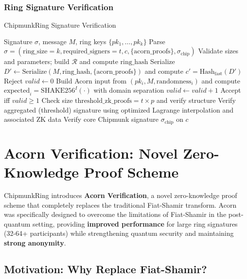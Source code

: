 \documentclass[11pt,a4paper]{article}
\begin{document}
\subsubsection{Ring Signature Verification}
\begin{algorithm}
\caption{ChipmunkRing Signature Verification}
\begin{algorithmic}[1]
\REQUIRE Signature $\sigma$, message $M$, ring keys $\{pk_1, \ldots, pk_k\}$
\STATE Parse $\sigma = (\text{ring\_size}=k, \text{required\_signers}=t, c, \{\text{acorn\_proofs}\}, \sigma_{\text{chip}})$
\STATE Validate sizes and parameters; build $\mathcal{R}$ and compute $\text{ring\_hash}$
\STATE Serialize $D' \leftarrow \text{Serialize}(M, \text{ring\_hash}, \{\text{acorn\_proofs}\})$ and compute $c' = \text{Hash}_{\text{fast}}(D')$
 \RETURN Reject \ENDIF
{} 
    \STATE $valid \leftarrow 0$
        \STATE Build Acorn input from $(pk_i, M, \text{randomness}_i)$ and compute $\text{expected}_i = \text{SHAKE256}^{I}(\cdot)$ with domain separation
         $valid \leftarrow valid + 1$ \ENDIF
    \ENDFOR
    \STATE Accept iff $valid \ge 1$
\ELSE {}
    \STATE Check size $\text{threshold\_zk\_proofs} = t \times p$ and verify structure
    \STATE Verify aggregated (threshold) signature using optimized Lagrange interpolation and associated ZK data
\ENDIF
\STATE Verify core Chipmunk signature $\sigma_{\text{chip}}$ on $c$
\end{algorithmic}
\end{algorithm}

\section{Acorn Verification: Novel Zero-Knowledge Proof Scheme}

ChipmunkRing introduces \textbf{Acorn Verification}, a novel zero-knowledge proof scheme that completely replaces the traditional Fiat-Shamir transform. Acorn was specifically designed to overcome the limitations of Fiat-Shamir in the post-quantum setting, providing \textbf{improved performance} for large ring signatures (32-64+ participants) while strengthening quantum security and maintaining \textbf{strong anonymity}.

\subsection{Motivation: Why Replace Fiat-Shamir?}
\end{document}
